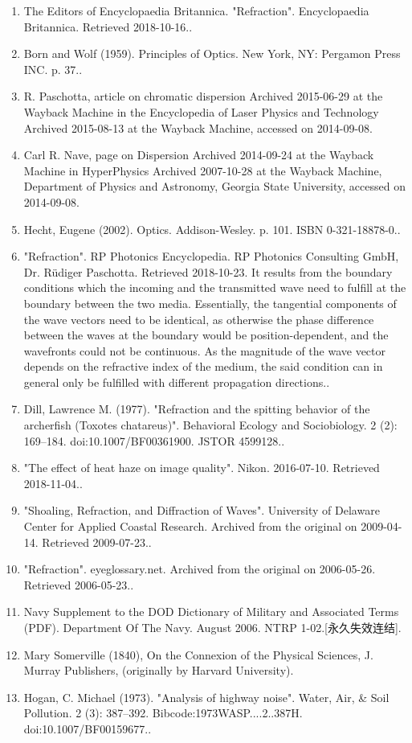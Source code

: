 \begin{enumerate}
\item The Editors of Encyclopaedia Britannica. "Refraction". Encyclopaedia Britannica. Retrieved 2018-10-16..
\item Born and Wolf (1959). Principles of Optics. New York, NY: Pergamon Press INC. p. 37..
\item R. Paschotta, article on chromatic dispersion Archived 2015-06-29 at the Wayback Machine in the Encyclopedia of Laser Physics and Technology Archived 2015-08-13 at the Wayback Machine, accessed on 2014-09-08.
\item  Carl R. Nave, page on Dispersion Archived 2014-09-24 at the Wayback Machine in HyperPhysics Archived 2007-10-28 at the Wayback Machine, Department of Physics and Astronomy, Georgia State University, accessed on 2014-09-08.
\item Hecht, Eugene (2002). Optics. Addison-Wesley. p. 101. ISBN 0-321-18878-0..
\item "Refraction". RP Photonics Encyclopedia. RP Photonics Consulting GmbH, Dr. Rüdiger Paschotta. Retrieved 2018-10-23. It results from the boundary conditions which the incoming and the transmitted wave need to fulfill at the boundary between the two media. Essentially, the tangential components of the wave vectors need to be identical, as otherwise the phase difference between the waves at the boundary would be position-dependent, and the wavefronts could not be continuous. As the magnitude of the wave vector depends on the refractive index of the medium, the said condition can in general only be fulfilled with different propagation directions..
\item Dill, Lawrence M. (1977). "Refraction and the spitting behavior of the archerfish (Toxotes chatareus)". Behavioral Ecology and Sociobiology. 2 (2): 169–184. doi:10.1007/BF00361900. JSTOR 4599128..
\item "The effect of heat haze on image quality". Nikon. 2016-07-10. Retrieved 2018-11-04..
\item "Shoaling, Refraction, and Diffraction of Waves". University of Delaware Center for Applied Coastal Research. Archived from the original on 2009-04-14. Retrieved 2009-07-23..
\item "Refraction". eyeglossary.net. Archived from the original on 2006-05-26. Retrieved 2006-05-23..
\item Navy Supplement to the DOD Dictionary of Military and Associated Terms (PDF). Department Of The Navy. August 2006. NTRP 1-02.[永久失效连结].
\item Mary Somerville (1840), On the Connexion of the Physical Sciences, J. Murray Publishers, (originally by Harvard University).
\item Hogan, C. Michael (1973). "Analysis of highway noise". Water, Air, & Soil Pollution. 2 (3): 387–392. Bibcode:1973WASP....2..387H. doi:10.1007/BF00159677..
\end{enumerate}
